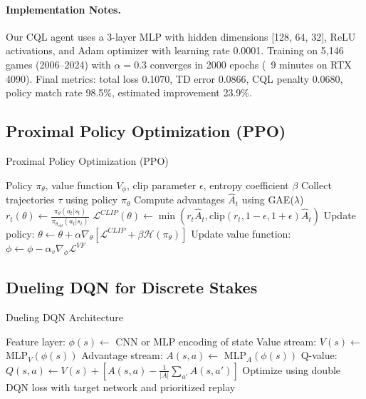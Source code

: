 \paragraph{Implementation Notes.}
Our CQL agent uses a 3-layer MLP with hidden dimensions [128, 64, 32], ReLU activations, and Adam optimizer with learning rate 0.0001. Training on 5,146 games (2006--2024) with $\alpha=0.3$ converges in 2000 epochs (~9 minutes on RTX 4090). Final metrics: total loss 0.1070, TD error 0.0866, CQL penalty 0.0680, policy match rate 98.5\%, estimated improvement 23.9\%.

\subsection{Proximal Policy Optimization (PPO)}
\begin{algorithm}[H]
\caption{Proximal Policy Optimization (PPO)}
\begin{algorithmic}[1]
\Require Policy $\pi_\theta$, value function $V_\phi$, clip parameter $\epsilon$, entropy coefficient $\beta$
  \State Collect trajectories $\tau$ using policy $\pi_\theta$
  \State Compute advantages $\hat{A}_t$ using GAE($\lambda$)
      \State $r_t(\theta) \gets \frac{\pi_\theta(a_t|s_t)}{\pi_{\theta_{old}}(a_t|s_t)}$
      \State $\mathcal{L}^{CLIP}(\theta) \gets \min(r_t \hat{A}_t, \text{clip}(r_t, 1-\epsilon, 1+\epsilon) \hat{A}_t)$
      \State Update policy: $\theta \gets \theta + \alpha \nabla_\theta [\mathcal{L}^{CLIP} + \beta \mathcal{H}(\pi_\theta)]$
    \EndFor
  \EndFor
  \State Update value function: $\phi \gets \phi - \alpha_v \nabla_\phi \mathcal{L}^{VF}$
\EndFor
\end{algorithmic}
\end{algorithm}

\subsection{Dueling DQN for Discrete Stakes}
\begin{algorithm}[H]
\caption{Dueling DQN Architecture}
\begin{algorithmic}[1]
\State Feature layer: $\phi(s) \gets$ CNN or MLP encoding of state
\State Value stream: $V(s) \gets$ MLP$_V(\phi(s))$
\State Advantage stream: $A(s,a) \gets$ MLP$_A(\phi(s))$
\State Q-value: $Q(s,a) \gets V(s) + \left[A(s,a) - \frac{1}{|A|}\sum_{a'} A(s,a')\right]$
\State Optimize using double DQN loss with target network and prioritized replay
\end{algorithmic}
\end{algorithm}

